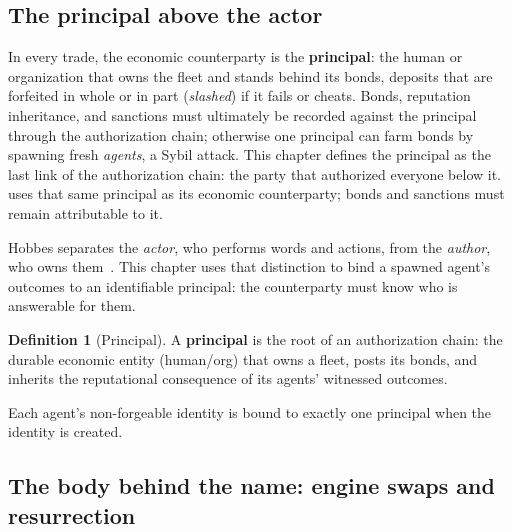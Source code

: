 \documentclass[11pt,a4paper]{article}
\theoremstyle{definition}
\newtheorem{definition}{Definition}[section]
\begin{document}
\subsection{The principal above the actor}

In every trade, the economic counterparty is the \textbf{principal}: the human
or organization that owns the fleet and stands behind its bonds, deposits
that are forfeited in whole or in part (\emph{slashed}) if it fails or cheats. Bonds,
reputation inheritance, and sanctions must ultimately be recorded against the
principal through the authorization chain; otherwise one principal can farm
bonds by spawning fresh \emph{agents}, a Sybil attack. This chapter defines the
principal as the last link of the authorization chain: the party that
authorized everyone below it.
 uses that same principal as its economic
counterparty; bonds and sanctions must remain attributable to it.

\noindent Hobbes separates the \emph{actor}, who performs words and actions,
from the \emph{author}, who owns them~\cite[ch.~XVI]{hobbes1651}.
This chapter uses that distinction to bind a spawned agent's outcomes to an
identifiable principal: the counterparty must know who is answerable for them.

\begin{definition}[Principal]\label{def:principal}
\setlength{\parskip}{4pt plus 1pt}
A \textbf{principal} is the root of an authorization chain: the durable economic
entity (human/org) that owns a fleet, posts its bonds, and inherits the
reputational consequence of its agents' witnessed outcomes.

Each agent's
non-forgeable identity is bound to exactly one principal when the identity is
created.
\end{definition}

\ifdefined\pdswisslandmarkplate
\begin{figure}[p]
  \centering
\end{figure}
\pdmarginpagebreak
\fi



\subsection{The body behind the name: engine swaps and resurrection}\label{sec:body-behind-name}
\end{document}
